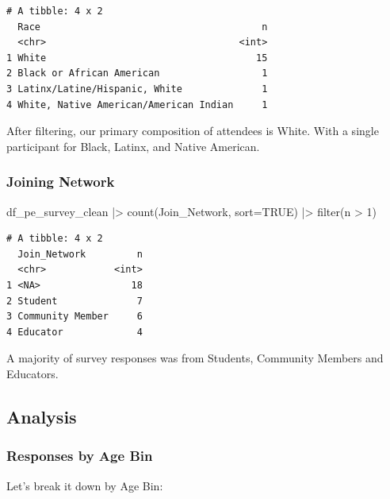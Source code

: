 \documentclass[
  letterpaper,
  DIV=11,
  numbers=noendperiod]{scrartcl}
\newenvironment{Shaded}{\begin{snugshade}}{\end{snugshade}}
\newcommand{\AttributeTok}[1]{\textcolor[rgb]{0.40,0.45,0.13}{#1}}
\newcommand{\ConstantTok}[1]{\textcolor[rgb]{0.56,0.35,0.01}{#1}}
\newcommand{\DecValTok}[1]{\textcolor[rgb]{0.68,0.00,0.00}{#1}}
\newcommand{\FunctionTok}[1]{\textcolor[rgb]{0.28,0.35,0.67}{#1}}
\newcommand{\NormalTok}[1]{\textcolor[rgb]{0.00,0.23,0.31}{#1}}
\newcommand{\SpecialCharTok}[1]{\textcolor[rgb]{0.37,0.37,0.37}{#1}}
\begin{document}
\begin{verbatim}
# A tibble: 4 x 2
  Race                                       n
  <chr>                                  <int>
1 White                                     15
2 Black or African American                  1
3 Latinx/Latine/Hispanic, White              1
4 White, Native American/American Indian     1
\end{verbatim}

After filtering, our primary composition of attendees is White. With a
single participant for Black, Latinx, and Native American.

\hypertarget{joining-network}{%
\subsubsection{Joining Network}\label{joining-network}}

\begin{Shaded}
\begin{Highlighting}[]
\NormalTok{df\_pe\_survey\_clean }\SpecialCharTok{|\textgreater{}} 
  \FunctionTok{count}\NormalTok{(Join\_Network, }\AttributeTok{sort=}\ConstantTok{TRUE}\NormalTok{) }\SpecialCharTok{|\textgreater{}} 
  \FunctionTok{filter}\NormalTok{(n }\SpecialCharTok{\textgreater{}} \DecValTok{1}\NormalTok{)}
\end{Highlighting}
\end{Shaded}

\begin{verbatim}
# A tibble: 4 x 2
  Join_Network         n
  <chr>            <int>
1 <NA>                18
2 Student              7
3 Community Member     6
4 Educator             4
\end{verbatim}

A majority of survey responses was from Students, Community Members and
Educators.

\hypertarget{analysis}{%
\subsection{Analysis}\label{analysis}}

\hypertarget{responses-by-age-bin}{%
\subsubsection{Responses by Age Bin}\label{responses-by-age-bin}}

Let's break it down by Age Bin:
\end{document}
